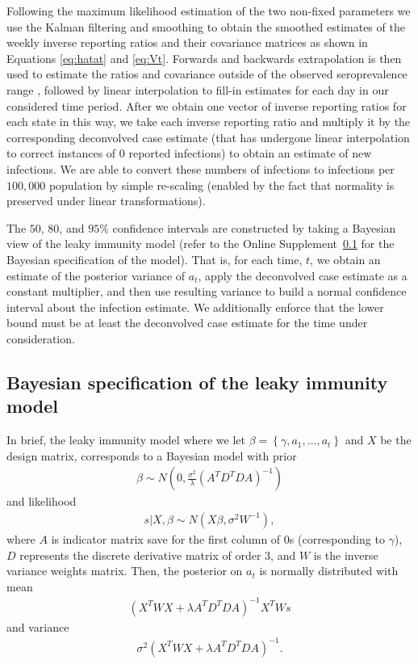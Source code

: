 \documentclass{article}
\begin{document}
Following the maximum likelihood estimation of the two non-fixed parameters
we use the Kalman filtering and smoothing to obtain the
smoothed estimates of the weekly inverse reporting ratios and
their covariance matrices as shown in Equations \ref{eq:hatat} and \ref{eq:Vt}.
Forwards and backwards extrapolation is then used to estimate the ratios and covariance
outside of the observed seroprevalence range \citep{durbin2012time}, followed by linear 
interpolation to fill-in estimates for each day in our considered time period. 
After we obtain one vector of inverse reporting ratios for each state in this
way, we take each inverse reporting ratio and multiply it by the corresponding
deconvolved case estimate (that has undergone linear interpolation to correct
instances of $0$ reported infections) to obtain an estimate of new infections.
We are able to convert these numbers of infections to
infections per $100,000$ population by simple re-scaling (enabled by the fact
that normality is preserved under linear transformations).

The $50$, $80$, and $95\%$ confidence intervals are constructed by taking a
Bayesian view of the leaky immunity model (refer to the Online
Supplement~\ref{supp:bayesleaky} for the Bayesian specification of the model). 
That is, for each time, $t$, we obtain an estimate of the
posterior variance of $a_t$, apply the deconvolved case estimate as a constant
multiplier, and then use resulting variance to build a normal confidence
interval about the infection estimate. We additionally enforce that the lower
bound must be at least the deconvolved case estimate for the time under consideration.


\subsection{Bayesian specification of the leaky immunity
model}\label{supp:bayesleaky} 
In brief, the leaky immunity model where we let
$\beta = \left \{  \gamma, a_1,\dots, a_t \right \}$ and $X$ be the design
matrix, corresponds to a Bayesian model with prior 
\begin{align*}
    \beta \sim N \left( 0,  \frac{\sigma^2 }{ \lambda} \left( A^TD^TDA 
    \right)^{-1}  \right)
\end{align*} and likelihood 
\begin{align*}
    s|X,\beta \sim N \left( X\beta, \sigma^2W^{-1} \right),
\end{align*} where $A$ is indicator matrix save for the first column of $0$s 
(corresponding to $\gamma$), $D$ represents the discrete derivative matrix of 
order $3$, and $W$ is the inverse variance weights matrix. Then, the posterior 
on $a_t$ is normally distributed with mean 
\begin{align*}
    \left ( X^TWX + \lambda A^TD^TDA \right )^{-1}X^TWs
\end{align*} 
and variance 
\begin{align*}
    \sigma^2 (X^TWX + \lambda A^TD^TDA)^{-1}.
\end{align*}
\end{document}

